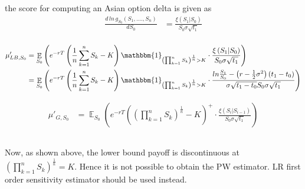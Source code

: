 \documentclass[10pt,oneside,a4paper]{article}
\DeclareMathOperator{\E}{\mathbb{E}}
\begin{document}
\begin{flushleft}
the score for computing an Asian option delta is given as
\begin{align*}
\frac{d \, ln \, g_{S_{0}} (S_1, ...., S_n)}{d S_0} &= \frac{\xi\left(S_1|S_{0}\right)}{S_0 \sigma \sqrt{t_1}}\\
\end{align*}

\begin{align*}
\mu'_{LB, S_0} &= \E _{S_0}\left(e^{-rT}\left( \frac{1}{n}\sum_{k=1}^{n}S_k - K\right)\mathbbm{1}_{\left( \prod_{k=1}^{n}S_k\right) ^{\frac{1}{n} }>K} \cdot \frac{\xi\left(S_1|S_{0}\right)}{S_0 \sigma \sqrt{t_1}} \right)\\
&= \E _{S_0}\left(e^{-rT}\left( \frac{1}{n}\sum_{k=1}^{n}S_k - K\right)\mathbbm{1}_{\left( \prod_{k=1}^{n}S_k\right) ^{\frac{1}{n} }>K} \cdot \frac{ln\frac{S_1}{S_0} - \left(r - \frac{1}{2}\sigma^2\right)\left(t_1 - t_0\right)}{\sigma\sqrt{t_1 - t_0}S_0\sigma\sqrt{t_1}}\right)
\end{align*}

\vspace{5mm}

\begin{align*}
\mu'_{G, S_0} &= \E _{S_0}\left(e^{-rT}\left(\left(\prod_{k=1}^{n}S_k\right) ^{\frac{1}{n}} - K\right)^{+} \cdot \frac{\xi\left(S_i|S_{i-1}\right)}{S_0 \sigma \sqrt{t_1}} \right)\\
\end{align*}
\subsubsection{}
Now, as shown above, the lower bound payoff is discontinuous at $\left( \prod_{k=1}^{n}S_k\right) ^{\frac{1}{n}} =K$. Hence it is not possible to obtain the PW estimator. LR first order sensitivity estimator should be used instead.


\end{flushleft}
\end{document}
